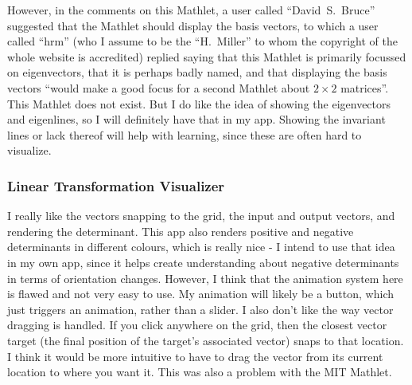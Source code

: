 \documentclass[../main.tex]{subfiles}
\begin{document}
However, in the comments on this Mathlet, a user called \enquote{David~S.~Bruce} suggested that the Mathlet should display the basis vectors, to which a user called \enquote{hrm} (who I assume to be the \enquote{H.~Miller} to whom the copyright of the whole website is accredited) replied saying that this Mathlet is primarily focussed on eigenvectors, that it is perhaps badly named, and that displaying the basis vectors \enquote{would make a good focus for a second Mathlet about $2 \times 2$ matrices}. This Mathlet does not exist. But I do like the idea of showing the eigenvectors and eigenlines, so I will definitely have that in my app. Showing the invariant lines or lack thereof will help with learning, since these are often hard to visualize.

\subsubsection{Linear Transformation Visualizer\label{analysis:research-on-existing-solutions:shad-io-matvis}}


I really like the vectors snapping to the grid, the input and output vectors, and rendering the determinant. This app also renders positive and negative determinants in different colours, which is really nice - I intend to use that idea in my own app, since it helps create understanding about negative determinants in terms of orientation changes. However, I think that the animation system here is flawed and not very easy to use. My animation will likely be a button, which just triggers an animation, rather than a slider. I also don't like the way vector dragging is handled. If you click anywhere on the grid, then the closest vector target (the final position of the target's associated vector) snaps to that location. I think it would be more intuitive to have to drag the vector from its current location to where you want it. This was also a problem with the MIT Mathlet.
\end{document}
